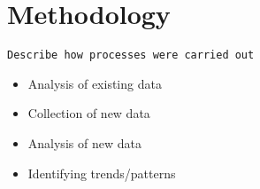 \section{Methodology}
	\texttt{Describe how processes were carried out}
	\begin{itemize}
		\item Analysis of existing data
		\item Collection of new data
		\item Analysis of new data
		\item Identifying trends/patterns
	\end{itemize}

\newpage
